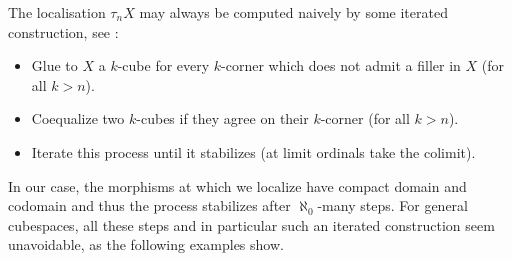 The localisation $\tau_{n}X$ may always be computed naively by some iterated construction, see \cite[Construction 1.37]{Adamek1994}:
\begin{itemize}
	\item Glue to $X$ a $k$-cube for every $k$-corner which does not admit a filler in $X$ (for all $k> n$).
	\item Coequalize two $k$-cubes if they agree on their $k$-corner (for all $k>n$).
	\item Iterate this process until it stabilizes (at limit ordinals take the colimit).
\end{itemize}
In our case, the morphisms at which we localize have compact domain and codomain
and thus the process stabilizes after $\aleph_0$-many steps.
For general cubespaces, all these steps and in particular such an iterated construction seem unavoidable,
as the following examples show.
